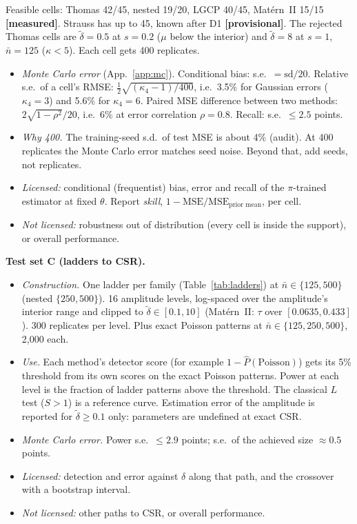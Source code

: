 \documentclass[10pt,a4paper]{article}
\newcommand{\measured}{\textcolor{green!45!black}{\textbf{[measured]}}}
\newcommand{\prov}{\textcolor{orange!85!black}{\textbf{[provisional]}}}
\newcommand{\nbar}{\bar n}
\newcommand{\dtil}{\tilde\delta}
\begin{document}
Feasible cells: Thomas 42/45, nested 19/20, LGCP 40/45, Mat\'ern~II 15/15 \measured. Strauss has up to 45, known after D1 \prov. The rejected Thomas cells are $\dtil=0.5$ at $s=0.2$ ($\mu$ below the interior) and $\dtil=8$ at $s=1$, $\nbar=125$ ($\kappa<5$). Each cell gets 400 replicates.
\begin{itemize}
  \item \emph{Monte Carlo error} (App.~\ref{app:mc}). Conditional bias: s.e.\ $=\text{sd}/20$. Relative s.e.\ of a cell's RMSE: $\tfrac12\sqrt{(\kappa_4-1)/400}$, i.e.\ 3.5\% for Gaussian errors ($\kappa_4=3$) and 5.6\% for $\kappa_4=6$. Paired MSE difference between two methods: $2\sqrt{1-\rho^2}/20$, i.e.\ 6\% at error correlation $\rho=0.8$. Recall: s.e.\ $\le2.5$ points.
  \item \emph{Why 400.} The training-seed s.d.\ of test MSE is about 4\% (audit). At 400 replicates the Monte Carlo error matches seed noise. Beyond that, add seeds, not replicates.
  \item \emph{Licensed:} conditional (frequentist) bias, error and recall of the $\pi$-trained estimator at fixed $\theta$. Report \emph{skill}, $1-\text{MSE}/\text{MSE}_{\text{prior mean}}$, per cell.
  \item \emph{Not licensed:} robustness out of distribution (every cell is inside the support), or overall performance.
\end{itemize}

\textbf{Test set C (ladders to CSR).}
\begin{itemize}
  \item \emph{Construction.} One ladder per family (Table~\ref{tab:ladders}) at $\nbar\in\{125,500\}$ (nested $\{250,500\}$). 16 amplitude levels, log-spaced over the amplitude's interior range and clipped to $\dtil\in[0.1,10]$ (Mat\'ern~II: $\tau$ over $[0.0635,0.433]$). 300 replicates per level. Plus exact Poisson patterns at $\nbar\in\{125,250,500\}$, 2{,}000 each.
  \item \emph{Use.} Each method's detector score (for example $1-\hat P(\text{Poisson})$) gets its 5\% threshold from its own scores on the exact Poisson patterns. Power at each level is the fraction of ladder patterns above the threshold. The classical $L$ test ($S>1$) is a reference curve. Estimation error of the amplitude is reported for $\dtil\ge0.1$ only: parameters are undefined at exact CSR.
  \item \emph{Monte Carlo error.} Power s.e.\ $\le2.9$ points; s.e.\ of the achieved size $\approx0.5$ points.
  \item \emph{Licensed:} detection and error against $\delta$ along that path, and the crossover with a bootstrap interval.
  \item \emph{Not licensed:} other paths to CSR, or overall performance.
\end{itemize}
\end{document}
